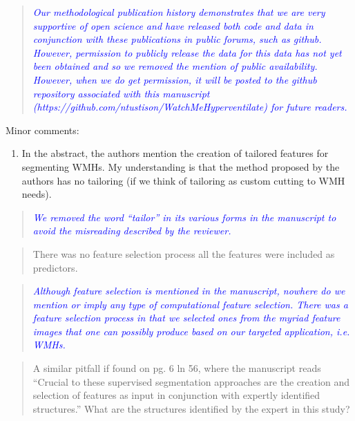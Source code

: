 \documentclass[12pt,]{article}
\providecommand{\tightlist}{%
  \setlength{\itemsep}{0pt}\setlength{\parskip}{0pt}}
\begin{document}
\begin{quote}
\emph{\textcolor{blue}{Our methodological publication history demonstrates that we are
very supportive of open science and have released both code and data in conjunction
with these publications in public forums, such as github.  However, permission to
publicly release the data for this data has not yet been obtained and so we removed
the mention of public availability.  However, when we do get permission, it will
be posted to the github repository associated with this manuscript
(https://github.com/ntustison/WatchMeHyperventilate) for future readers.
}}
\end{quote}

Minor comments:

\begin{enumerate}
\def\labelenumi{\arabic{enumi}.}
\setcounter{enumi}{4}
\tightlist
\item
  In the abstract, the authors mention the creation of tailored features
  for segmenting WMHs. My understanding is that the method proposed by
  the authors has no tailoring (if we think of tailoring as custom
  cutting to WMH needs).
\end{enumerate}

\begin{quote}
\emph{\textcolor{blue}{We removed the word ``tailor'' in its various forms in the
manuscript to avoid the misreading described by the reviewer.}}
\end{quote}

\begin{quote}
There was no feature selection process all the features were included as
predictors.
\end{quote}

\begin{quote}
\emph{\textcolor{blue}{Although feature selection is mentioned in the manuscript, nowhere
do we mention or imply any type of computational feature selection.  There was
a feature selection process in that we selected ones from the myriad feature images that
one can possibly produce based on our targeted application, i.e. WMHs.}}
\end{quote}

\begin{quote}
A similar pitfall if found on pg. 6 ln 56, where the manuscript reads
``Crucial to these supervised segmentation approaches are the creation
and selection of features as input in conjunction with expertly
identified structures.'' What are the structures identified by the
expert in this study?
\end{quote}
\end{document}
